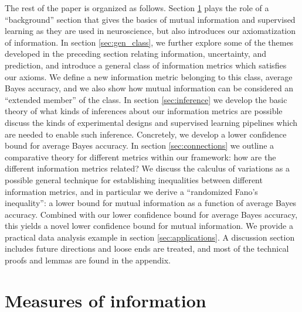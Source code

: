 \documentclass[12pt]{article}
\begin{document}
The rest of the paper is organized as follows.  Section \ref{sec:info}
plays the role of a ``background'' section that gives the basics of
mutual information and supervised learning as they are used in
neuroscience, but also introduces our axiomatization of information.
In section \ref{sec:gen_class}, we further explore some of the themes
developed in the preceding section relating information, uncertainty,
and prediction, and introduce a general class of information metrics
which satisfies our axioms.  We define a new information metric
belonging to this class, average Bayes accuracy, and we also show how
mutual information can be considered an ``extended member'' of the
class.  In section \ref{sec:inference} we develop the basic theory of
what kinds of inferences about our information metrics are possible
discuss the kinds of experimental designs and supervised learning
pipelines which are needed to enable such inference.  Concretely, we
develop a lower confidence bound for average Bayes accuracy. In
section \ref{sec:connections} we outline a comparative theory for
different metrics within our framework: how are the different
information metrics related?  We discuss the calculus of variations as
a possible general technique for establishing inequalities between
different information metrics, and in particular we derive a
``randomized Fano's inequality'': a lower bound for mutual information
as a function of average Bayes accuracy.  Combined with our lower
confidence bound for average Bayes accuracy, this yields a novel lower
confidence bound for mutual information.  We provide a practical data
analysis example in section \ref{sec:applications}.  A discussion
section includes future directions and loose ends are treated, and
most of the technical proofs and lemmas are found in the appendix.

\section{Measures of information}\label{sec:info}
\end{document}
